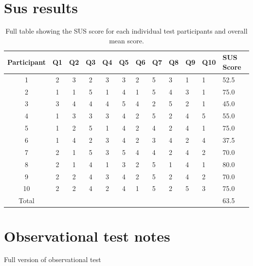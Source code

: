 \section{Sus results}\label{appendix:susResults}
\begin{table}[H]
	\centering
	\caption{Full table showing the SUS score for each individual test participants and overall mean score.}
	\label{tab:susScoreTableAppendix}
	\begin{tabular}{|c|c|c|c|c|c|l|l|l|l|l|l|}
		\hline
		Participant & Q1 & Q2 & Q3 & Q4 & Q5 & Q6 & Q7 & Q8 & Q9 & Q10 & SUS Score \\ \hline
		1           & 2  & 3  & 2  & 3  & 3  & 2  & 5  & 3  & 1  & 1   & 52.5      \\ \hline
		2           & 1  & 1  & 5  & 1  & 4  & 1  & 5  & 4  & 3  & 1   & 75.0      \\ \hline
		3           & 3  & 4  & 4  & 4  & 5  & 4  & 2  & 5  & 2  & 1   & 45.0      \\ \hline
		4           & 1  & 3  & 3  & 3  & 4  & 2  & 5  & 2  & 4  & 5   & 55.0      \\ \hline
		5           & 1  & 2  & 5  & 1  & 4  & 2  & 4  & 2  & 4  & 1   & 75.0      \\ \hline
		6           & 1  & 4  & 2  & 3  & 4  & 2  & 3  & 4  & 2  & 4   & 37.5      \\ \hline
		7           & 2  & 1  & 5  & 3  & 5  & 4  & 4  & 2  & 4  & 2   & 70.0      \\ \hline
		8           & 2  & 1  & 4  & 1  & 3  & 2  & 5  & 1  & 4  & 1   & 80.0      \\ \hline
		9           & 2  & 2  & 4  & 3  & 4  & 2  & 5  & 2  & 4  & 2   & 70.0      \\ \hline
		10          & 2  & 2  & 4  & 2  & 4  & 1  & 5  & 2  & 5  & 3   & 75.0      \\ \hline
		Total       &    &    &    &    &    &    &    &    &    &     & 63.5      \\ \hline
	\end{tabular}
\end{table}

\section{Observational test notes}
\begin{table}[H]
\centering


\caption{Full version of observational test}
\label{table:observationalNotesBig}
%
\end{table} 